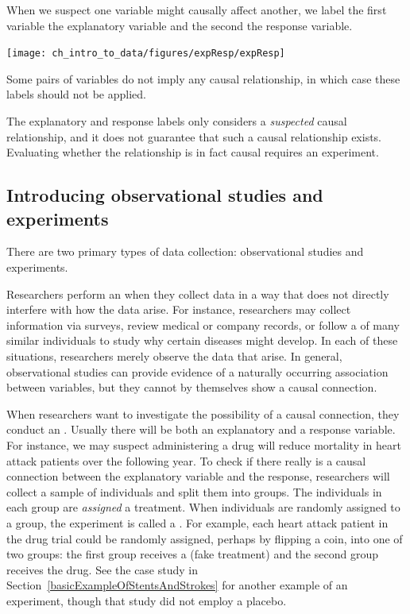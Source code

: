 
\begin{termBox}{
When we suspect one variable might causally affect another,
we label the first variable the explanatory variable and the
second the response variable.
\vspace{1mm}

\hspace{10mm}\texttt{[image: ch\_intro\_to\_data/figures/expResp/expResp]}

Some pairs of variables do not imply any causal relationship,
in which case these labels should not be applied.}
\end{termBox}

The explanatory and response labels only considers
a \emph{suspected} causal relationship, and it does not guarantee
that such a causal relationship exists.
Evaluating whether the relationship is in fact causal
requires an experiment.


\subsection{Introducing observational studies and experiments}

There are two primary types of data collection: observational studies and experiments.

Researchers perform an  when they collect data in a way that does not directly interfere with how the data arise. For instance, researchers may collect information via surveys, review medical or company records, or follow a  of many similar individuals to study why certain diseases might develop. In each of these situations, researchers merely observe the data that arise. In general, observational studies can provide evidence of a naturally occurring association between variables, but they cannot by themselves show a causal connection.

When researchers want to investigate the possibility of a causal connection, they conduct an . Usually there will be both an explanatory and a response variable. For instance, we may suspect administering a drug will reduce mortality in heart attack patients over the following year. To check if there really is a causal connection between the explanatory variable and the response, researchers will collect a sample of individuals and split them into groups. The individuals in each group are \emph{assigned} a treatment. When individuals are randomly assigned to a group, the experiment is called a . For example, each heart attack patient in the drug trial could be randomly assigned,  perhaps by flipping a coin, into one of two groups: the first group receives a  (fake treatment) and the second group receives the drug. See the case study in Section~\ref{basicExampleOfStentsAndStrokes} for another example of an experiment, though that study did not employ a placebo.


